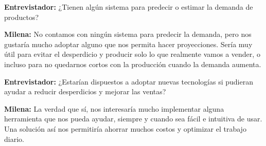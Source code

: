 \vspace{0.5em}

\textbf{Entrevistador:} ¿Tienen algún sistema para predecir o estimar la demanda de productos?  

\textbf{Milena:} No contamos con ningún sistema para predecir la demanda, pero nos gustaría mucho adoptar alguno que nos permita hacer proyecciones. Sería muy útil para evitar el desperdicio y producir solo lo que realmente vamos a vender, o incluso para no quedarnos cortos con la producción cuando la demanda aumenta.  

\vspace{0.5em}

\textbf{Entrevistador:} ¿Estarían dispuestos a adoptar nuevas tecnologías si pudieran ayudar a reducir desperdicios y mejorar las ventas?  

\textbf{Milena:} La verdad que sí, nos interesaría mucho implementar alguna herramienta que nos pueda ayudar, siempre y cuando sea fácil e intuitiva de usar. Una solución así nos permitiría ahorrar muchos costos y optimizar el trabajo diario.  
